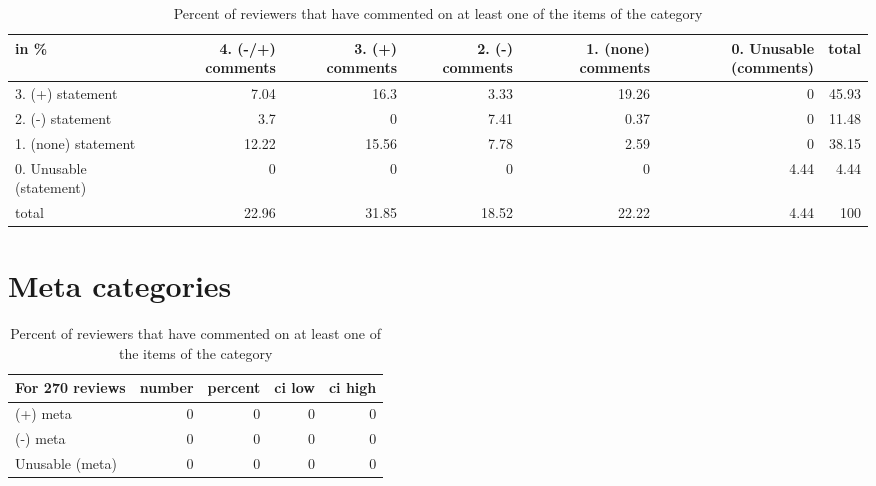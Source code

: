 \documentclass{article}
\begin{document}
\begin{table}[H]

\centering

\begin{tabular}{lrrrrrr}
\hline
 in \%                    &   4. (-/+) comments &   3. (+) comments &   2. (-) comments &   1. (none) comments &   0. Unusable (comments) &   total \\
\hline
 3. (+) statement        &                7.04 &             16.3  &              3.33 &                19.26 &                     0    &   45.93 \\
 2. (-) statement        &                3.7  &              0    &              7.41 &                 0.37 &                     0    &   11.48 \\
 1. (none) statement     &               12.22 &             15.56 &              7.78 &                 2.59 &                     0    &   38.15 \\
 0. Unusable (statement) &                0    &              0    &              0    &                 0    &                     4.44 &    4.44 \\
 total                   &               22.96 &             31.85 &             18.52 &                22.22 &                     4.44 &  100    \\
\hline
\end{tabular}\caption{Percent of reviewers that have commented on at least one of the items of the category}

\end{table}



\section{Meta categories} 

\begin{table}[H]

\centering

\begin{tabular}{lrrrr}
\hline
 For 270 reviews   &   number &   percent &   ci low &   ci high \\
\hline
 (+) meta          &        0 &         0 &        0 &         0 \\
 (-) meta          &        0 &         0 &        0 &         0 \\
 Unusable (meta)   &        0 &         0 &        0 &         0 \\
\hline
\end{tabular}\caption{Percent of reviewers that have commented on at least one of the items of the category}

\end{table}
\end{document}
